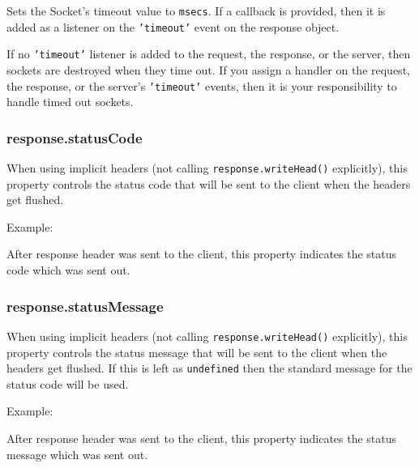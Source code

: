 Sets the Socket's timeout value to \texttt{msecs}. If a callback is
provided, then it is added as a listener on the \texttt{'timeout'} event
on the response object.

If no \texttt{'timeout'} listener is added to the request, the response,
or the server, then sockets are destroyed when they time out. If you
assign a handler on the request, the response, or the server's
\texttt{'timeout'} events, then it is your responsibility to handle
timed out sockets.

\subsubsection{response.statusCode}

When using implicit headers (not calling \texttt{response.writeHead()}
explicitly), this property controls the status code that will be sent to
the client when the headers get flushed.

Example:

\begin{Shaded}
\begin{Highlighting}[]
 \NormalTok{= }\NormalTok{;}
\end{Highlighting}
\end{Shaded}

After response header was sent to the client, this property indicates
the status code which was sent out.

\subsubsection{response.statusMessage}

When using implicit headers (not calling \texttt{response.writeHead()}
explicitly), this property controls the status message that will be sent
to the client when the headers get flushed. If this is left as
\texttt{undefined} then the standard message for the status code will be
used.

Example:

\begin{Shaded}
\begin{Highlighting}[]
 \NormalTok{= }\NormalTok{;}
\end{Highlighting}
\end{Shaded}

After response header was sent to the client, this property indicates
the status message which was sent out.

